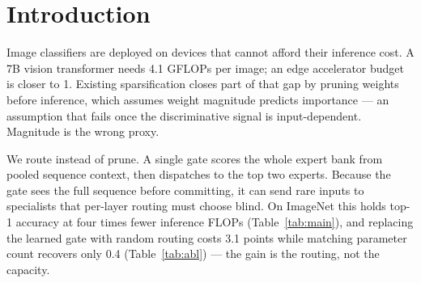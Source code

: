 \documentclass{article}
\begin{document}
\section{Introduction}
Image classifiers are deployed on devices that cannot afford their inference cost.
A 7B vision transformer needs 4.1 GFLOPs per image; an edge accelerator budget is
closer to 1. Existing sparsification closes part of that gap by pruning weights
before inference, which assumes weight magnitude predicts importance --- an
assumption that fails once the discriminative signal is input-dependent.
Magnitude is the wrong proxy.

We route instead of prune. A single gate scores the whole expert bank from pooled
sequence context, then dispatches to the top two experts. Because the gate sees the
full sequence before committing, it can send rare inputs to specialists that
per-layer routing must choose blind. On ImageNet this holds top-1 accuracy at four
times fewer inference FLOPs (Table~\ref{tab:main}), and replacing the learned gate
with random routing costs 3.1 points while matching parameter count recovers only
0.4 (Table~\ref{tab:abl}) --- the gain is the routing, not the capacity.
\end{document}
